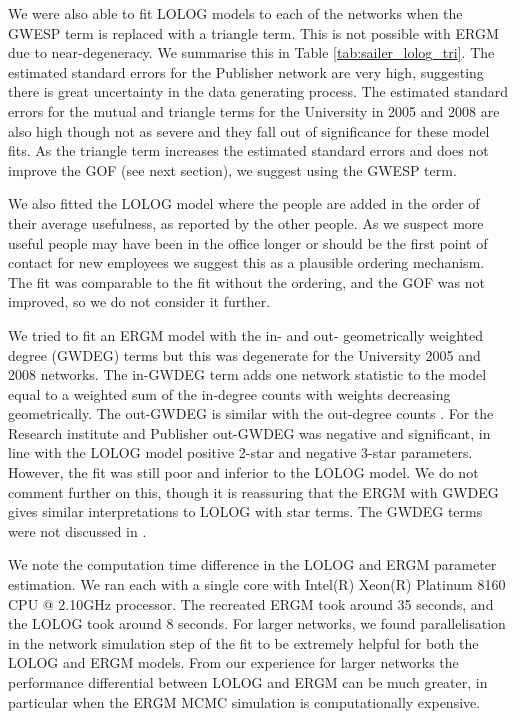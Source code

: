 \documentclass[
]{statsoc}
\begin{document}
We were also able to fit LOLOG models to each of the networks when the
GWESP term is replaced with a triangle term. This is not possible with
ERGM due to near-degeneracy. We summarise this in Table
\ref{tab:sailer_lolog_tri}. The estimated standard errors for the
Publisher network are very high, suggesting there is great uncertainty
in the data generating process. The estimated standard errors for the
mutual and triangle terms for the University in 2005 and 2008 are also
high though not as severe and they fall out of significance for these
model fits. As the triangle term increases the estimated standard errors
and does not improve the GOF (see next section), we suggest using the
GWESP term.

We also fitted the LOLOG model where the people are added in the order
of their average usefulness, as reported by the other people. As we
suspect more useful people may have been in the office longer or should
be the first point of contact for new employees we suggest this as a
plausible ordering mechanism. The fit was comparable to the fit without
the ordering, and the GOF was not improved, so we do not consider it
further.

We tried to fit an ERGM model with the in- and out- geometrically
weighted degree (GWDEG) terms but this was degenerate for the University
2005 and 2008 networks. The in-GWDEG term adds one network statistic to
the model equal to a weighted sum of the in-degree counts with weights
decreasing geometrically. The out-GWDEG is similar with the out-degree
counts \citep[See][for a detailed explanation]{hunter07}. For the
Research institute and Publisher out-GWDEG was negative and significant,
in line with the LOLOG model positive 2-star and negative 3-star
parameters. However, the fit was still poor and inferior to the LOLOG
model. We do not comment further on this, though it is reassuring that
the ERGM with GWDEG gives similar interpretations to LOLOG with star
terms. The GWDEG terms were not discussed in \cite{Sailer2012}.

We note the computation time difference in the LOLOG and ERGM parameter
estimation. We ran each with a single core with Intel(R) Xeon(R)
Platinum 8160 CPU @ 2.10GHz processor. The recreated ERGM took around 35
seconds, and the LOLOG took around 8 seconds. For larger networks, we
found parallelisation in the network simulation step of the fit to be
extremely helpful for both the LOLOG and ERGM models. From our
experience for larger networks the performance differential between
LOLOG and ERGM can be much greater, in particular when the ERGM MCMC
simulation is computationally expensive.
\end{document}
